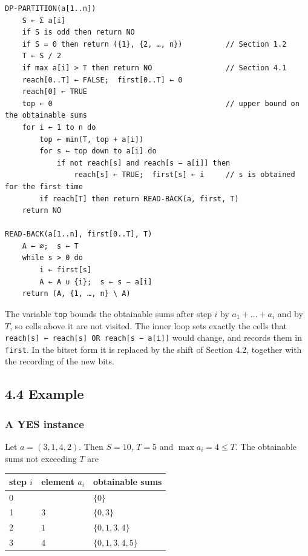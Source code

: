 \documentclass[
]{article}
\begin{document}
\begin{verbatim}
DP-PARTITION(a[1..n])
    S ← Σ a[i]
    if S is odd then return NO
    if S = 0 then return ({1}, {2, …, n})          // Section 1.2
    T ← S / 2
    if max a[i] > T then return NO                 // Section 4.1
    reach[0..T] ← FALSE;  first[0..T] ← 0
    reach[0] ← TRUE
    top ← 0                                        // upper bound on the obtainable sums
    for i ← 1 to n do
        top ← min(T, top + a[i])
        for s ← top down to a[i] do
            if not reach[s] and reach[s − a[i]] then
                reach[s] ← TRUE;  first[s] ← i     // s is obtained for the first time
        if reach[T] then return READ-BACK(a, first, T)
    return NO

READ-BACK(a[1..n], first[0..T], T)
    A ← ∅;  s ← T
    while s > 0 do
        i ← first[s]
        A ← A ∪ {i};  s ← s − a[i]
    return (A, {1, …, n} \ A)
\end{verbatim}

The variable \texttt{top} bounds the obtainable sums after step \(i\) by
\(a_1 + \dots + a_i\) and by \(T\), so cells above it are not visited.
The inner loop sets exactly the cells that
\texttt{reach{[}s{]}\ ←\ reach{[}s{]}\ OR\ reach{[}s\ −\ a{[}i{]}{]}}
would change, and records them in \texttt{first}. In the bitset form it
is replaced by the shift of Section 4.2, together with the recording of
the new bits.

\hypertarget{example}{%
\subsection{4.4 Example}\label{example}}

\hypertarget{a-yes-instance-2}{%
\subsubsection{A YES instance}\label{a-yes-instance-2}}

Let \(a = (3, 1, 4, 2)\). Then \(S = 10\), \(T = 5\) and
\(\max a_i = 4 \le T\). The obtainable sums not exceeding \(T\) are

\begin{longtable}[]{@{}lll@{}}
\toprule
step \(i\) & element \(a_i\) & obtainable sums \\
\midrule
\endhead
0 &  & \(\lbrace 0 \rbrace\) \\
\midrule
1 & \(3\) & \(\lbrace 0, 3 \rbrace\) \\
\midrule
2 & \(1\) & \(\lbrace 0, 1, 3, 4 \rbrace\) \\
\midrule
3 & \(4\) & \(\lbrace 0, 1, 3, 4, 5 \rbrace\) \\
\bottomrule
\end{longtable}
\end{document}
